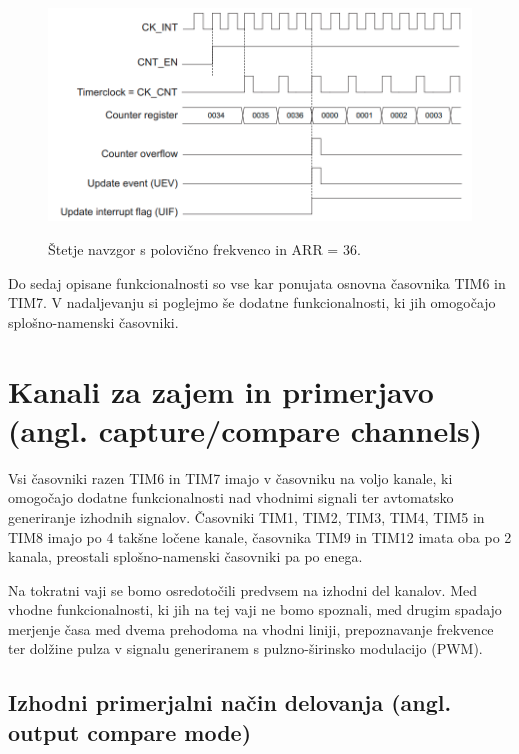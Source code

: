 \documentclass[12pt,letterpaper]{article}
\begin{document}
\begin{figure}[ht!]
  \centering
  \caption{Štetje navzgor s polovično frekvenco in ARR = 36.}
  \includegraphics[width=350pt]{images/vaja7/prescaler1.png}
  \label{up_psc_1}
\end{figure}

Do sedaj opisane funkcionalnosti so vse kar ponujata osnovna časovnika TIM6 in TIM7. V nadaljevanju si poglejmo še dodatne funkcionalnosti, ki jih omogočajo splošno-namenski časovniki.


\section*{Kanali za zajem in primerjavo (angl. capture/compare channels)}

Vsi časovniki razen TIM6 in TIM7 imajo v časovniku na voljo kanale, ki omogočajo dodatne funkcionalnosti nad vhodnimi signali ter avtomatsko generiranje izhodnih signalov. Časovniki TIM1, TIM2, TIM3, TIM4, TIM5 in TIM8 imajo po 4 takšne ločene kanale, časovnika TIM9 in TIM12 imata oba po 2 kanala, preostali splošno-namenski časovniki pa po enega.

Na tokratni vaji se bomo osredotočili predvsem na izhodni del kanalov. Med vhodne funkcionalnosti, ki jih na tej vaji ne bomo spoznali, med drugim spadajo merjenje časa med dvema prehodoma na vhodni liniji, prepoznavanje frekvence ter dolžine pulza v signalu generiranem s pulzno-širinsko modulacijo (PWM).


\subsection*{Izhodni primerjalni način delovanja (angl. output compare mode)}
\end{document}
